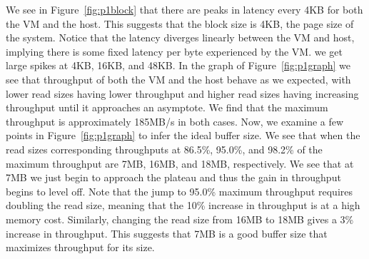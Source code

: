 We see in Figure~\ref{fig:p1block} that there are peaks in latency every 4KB for 
both the VM and the host. This suggests that the block size is 4KB, the page size
of the system. Notice that the latency diverges linearly between the VM and host,
implying there is some fixed latency per byte experienced by the VM. we get large
spikes at 4KB, 16KB, and 48KB.
In the graph of Figure~\ref{fig:p1graph} we see that throughput of 
both the VM and the host behave
as we expected, with lower read sizes having lower throughput and higher read sizes
having increasing throughput until it approaches an asymptote. We find that the 
maximum throughput is approximately 185MB/s in both cases. Now, we examine a few
points in Figure~\ref{fig:p1graph} to infer the ideal buffer size. We see that when 
the read sizes corresponding throughputs at 86.5\%, 95.0\%, and 98.2\% of the maximum 
throughput are 7MB, 16MB, and 18MB, respectively. We see that at 7MB we just begin to 
approach the plateau and thus the gain in throughput begins to level off.
Note that the jump to 95.0\% maximum throughput requires doubling the read size, 
meaning that the 10\% increase in throughput is at a high memory cost. Similarly, 
changing the read size from 16MB to 18MB gives a 3\% increase in throughput. This 
suggests that 7MB is a good buffer size that maximizes throughput for its size.



